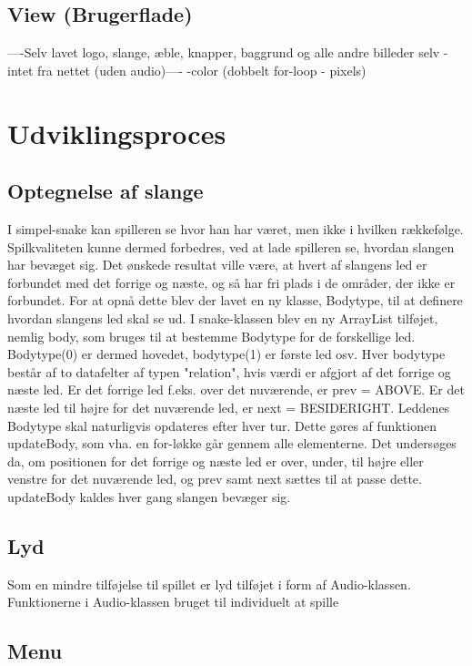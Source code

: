 \documentclass{report}
\begin{document}
\subsection{View (Brugerflade)}
----Selv lavet logo, slange, æble, knapper, baggrund og alle andre billeder selv - intet fra nettet (uden audio)----
-color (dobbelt for-loop - pixels)


\section{Udviklingsproces}

\subsection{Optegnelse af slange}

I simpel-snake kan spilleren se hvor han har været, men ikke i hvilken rækkefølge. Spilkvaliteten kunne dermed forbedres, ved at lade spilleren se, hvordan slangen har bevæget sig. Det ønskede resultat ville være, at hvert af slangens led er forbundet med det forrige og næste, og så har fri plads i de områder, der ikke er forbundet.
For at opnå dette blev der lavet en ny klasse, Bodytype, til at definere hvordan slangens led skal se ud. I snake-klassen blev en ny ArrayList tilføjet, nemlig body, som bruges til at bestemme Bodytype for de forskellige led. Bodytype(0) er dermed hovedet, bodytype(1) er første led osv. Hver bodytype består af to datafelter af typen "relation", hvis værdi er afgjort af det forrige og næste led. Er det forrige led f.eks. over det nuværende, er prev = ABOVE. Er det næste led til højre for det nuværende led, er next = BESIDERIGHT.
Leddenes Bodytype skal naturligvis opdateres efter hver tur. Dette gøres af funktionen updateBody, som vha. en for-løkke går gennem alle elementerne. Det undersøges da, om positionen for det forrige og næste led er over, under, til højre eller venstre for det nuværende led, og prev samt next sættes til at passe dette. updateBody kaldes hver gang slangen bevæger sig.

\subsection{Lyd}

Som en mindre tilføjelse til spillet er lyd tilføjet i form af Audio-klassen. Funktionerne i Audio-klassen bruget til individuelt at spille 	

\subsection{Menu}
\end{document}
